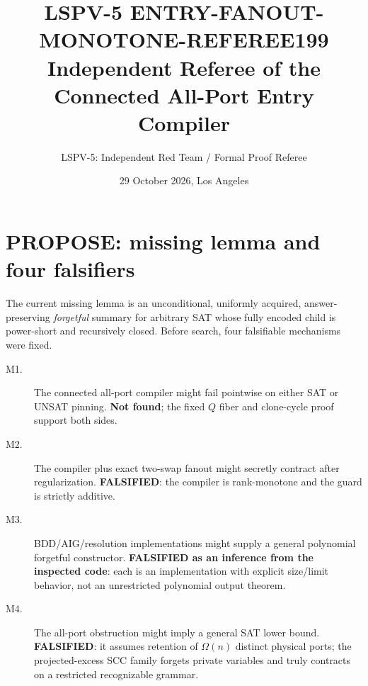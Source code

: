 \documentclass[11pt]{article}
\title{LSPV-5 ENTRY-FANOUT-MONOTONE-REFEREE199\\
Independent Referee of the Connected All-Port Entry Compiler}
\author{LSPV-5: Independent Red Team / Formal Proof Referee}
\date{29 October 2026, Los Angeles}
\begin{document}
\maketitle

\begin{center}
\end{center}

\section{PROPOSE: missing lemma and four falsifiers}
The current missing lemma is an unconditional, uniformly acquired, answer-preserving \emph{forgetful} summary for arbitrary SAT whose fully encoded child is power-short and recursively closed.  Before search, four falsifiable mechanisms were fixed.
\begin{description}
\item[M1.] The connected all-port compiler might fail pointwise on either SAT or UNSAT pinning.  \textbf{Not found}; the fixed $Q$ fiber and clone-cycle proof support both sides.
\item[M2.] The compiler plus exact two-swap fanout might secretly contract after regularization.  \textbf{FALSIFIED}: the compiler is rank-monotone and the guard is strictly additive.
\item[M3.] BDD/AIG/resolution implementations might supply a general polynomial forgetful constructor.  \textbf{FALSIFIED as an inference from the inspected code}: each is an implementation with explicit size/limit behavior, not an unrestricted polynomial output theorem.
\item[M4.] The all-port obstruction might imply a general SAT lower bound.  \textbf{FALSIFIED}: it assumes retention of $\Omega(n)$ distinct physical ports; the projected-excess SCC family forgets private variables and truly contracts on a restricted recognizable grammar.
\end{description}
\end{document}
